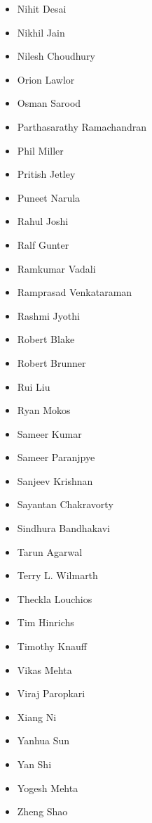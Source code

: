 \begin{itemize}
\item Nihit Desai
\item Nikhil Jain
\item Nilesh Choudhury
\item Orion Lawlor
\item Osman Sarood
\item Parthasarathy Ramachandran
\item Phil Miller
\item Pritish Jetley
\item Puneet Narula
\item Rahul Joshi
\item Ralf Gunter
\item Ramkumar Vadali
\item Ramprasad Venkataraman
\item Rashmi Jyothi
\item Robert Blake
\item Robert Brunner
\item Rui Liu
\item Ryan Mokos
\item Sameer Kumar
\item Sameer Paranjpye
\item Sanjeev Krishnan
\item Sayantan Chakravorty
\item Sindhura Bandhakavi
\item Tarun Agarwal
\item Terry L. Wilmarth
\item Theckla Louchios
\item Tim Hinrichs
\item Timothy Knauff
\item Vikas Mehta
\item Viraj Paropkari
\item Xiang Ni
\item Yanhua Sun
\item Yan Shi
\item Yogesh Mehta
\item Zheng Shao
\end{itemize}
